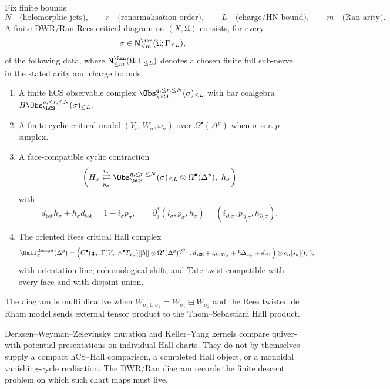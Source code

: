 \begin{definition}
\label{def:simplicial-sheaf-cohas}
Fix finite bounds
\[
 N\quad\text{(holomorphic jets)},\qquad
 r\quad\text{(renormalisation order)},\qquad
 L\quad\text{(charge/HN bound)},\qquad
 m\quad\text{(Ran arity)}.
\]
A finite DWR/Ran Rees critical diagram on $(X,\mathfrak U)$ consists,
for every
\[
 \sigma\in
 \mathsf N^{\Ran}_{\le m}(\mathfrak U;\Gamma_{\le L}),
\]
of the following data, where
$\mathsf N^{\Ran}_{\le m}(\mathfrak U;\Gamma_{\le L})$ denotes a
chosen finite full sub-nerve in the stated arity and charge bounds.
\begin{enumerate}
\item A finite hCS observable complex
 $\Obs_{\hCS}^{q,\le r,\le N}(\sigma)_{\le L}$ with bar coalgebra
 $B\Obs_{\hCS}^{q,\le r,\le N}(\sigma)_{\le L}$.
\item A finite cyclic critical model $(V_\sigma,W_\sigma,\omega_\sigma)$
 over $\Omega^\bullet(\Delta^p)$ when $\sigma$ is a $p$-simplex.
\item A face-compatible cyclic contraction
 \[
 \left(
 H_\sigma
 \underset{p_\sigma}{\stackrel{i_\sigma}{\rightleftarrows}}
 \Obs_{\hCS}^{q,\le r,\le N}(\sigma)_{\le L}
 \otimes\Omega^\bullet(\Delta^p),
 \ h_\sigma
 \right)
 \]
 with
 \[
 d_{\mathrm{tot}}h_\sigma+h_\sigma d_{\mathrm{tot}}
 =1-i_\sigma p_\sigma,\qquad
 \partial_j^*(i_\sigma,p_\sigma,h_\sigma)=
 (i_{\partial_j\sigma},p_{\partial_j\sigma},h_{\partial_j\sigma}).
 \]
\item The oriented Rees critical Hall complex
 \[
 \Hall_{\sigma}^{\mathrm{Rees},\mathrm{or}}(\Delta^p)
 =
 \left(
 C^\bullet\!\left(
 \mathfrak g_\sigma,
 \Gamma(V_\sigma,\wedge^\bullet T_{V_\sigma})[[\hbar]]
 \otimes\Omega^\bullet(\Delta^p)
 \right)^{G_\sigma},
 d_{\CE}+\iota_{d_VW_\sigma}
 +\hbar\Delta_{\omega_\sigma}+d_{\Delta^p}
 \right)
 \otimes o_\sigma[s_\sigma](t_\sigma),
 \]
 with orientation line, cohomological shift, and Tate twist compatible
 with every face and with disjoint union.
\end{enumerate}
The diagram is multiplicative when
$W_{\sigma_1\sqcup\sigma_2}=W_{\sigma_1}\boxplus W_{\sigma_2}$ and the
Rees twisted de Rham model sends external tensor product to the
Thom--Sebastiani Hall product.
\end{definition}

\begin{remark}
\label{rem:strictness-fails}
Derksen--Weyman--Zelevinsky mutation and Keller--Yang kernels compare
quiver-with-potential presentations on individual Hall charts. They do
not by themselves supply a compact hCS--Hall comparison, a completed
Hall object, or a monoidal vanishing-cycle realisation. The DWR/Ran
diagram records the finite descent problem on which such chart maps
must live.
\end{remark}

